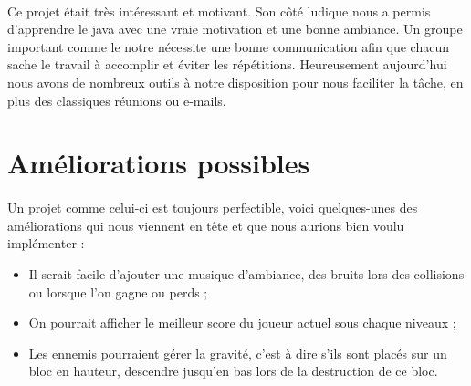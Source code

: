 \documentclass[a4paper,12pt]{report}
\begin{document}
\paragraph{}Ce projet était très intéressant et motivant. Son côté ludique nous a permis d'apprendre le java avec une vraie motivation et une bonne ambiance. Un groupe important comme le notre nécessite une bonne communication afin que chacun sache le travail à accomplir et éviter les répétitions. Heureusement aujourd'hui nous avons de nombreux outils à notre disposition pour nous faciliter la tâche, en plus des classiques réunions ou e-mails.

\section{Améliorations possibles}
\paragraph{}Un projet comme celui-ci est toujours perfectible, voici quelques-unes des améliorations qui nous viennent en tête et que nous aurions bien voulu implémenter :
\begin{itemize}
\item Il serait facile d'ajouter une musique d'ambiance, des bruits lors des collisions ou lorsque l'on gagne ou perds ;
\item On pourrait afficher le meilleur score du joueur actuel sous chaque niveaux ;
\item Les ennemis pourraient gérer la gravité, c'est à dire s'ils sont placés sur un bloc en hauteur, descendre jusqu'en bas lors de la destruction de ce bloc.
\end{itemize}
\end{document}
